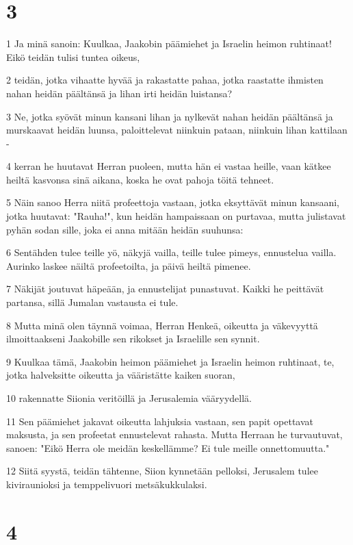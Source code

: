 \chapter{3}

\par 1 Ja minä sanoin: Kuulkaa, Jaakobin päämiehet ja Israelin heimon ruhtinaat! Eikö teidän tulisi tuntea oikeus,
\par 2 teidän, jotka vihaatte hyvää ja rakastatte pahaa, jotka raastatte ihmisten nahan heidän päältänsä ja lihan irti heidän luistansa?
\par 3 Ne, jotka syövät minun kansani lihan ja nylkevät nahan heidän päältänsä ja murskaavat heidän luunsa, paloittelevat niinkuin pataan, niinkuin lihan kattilaan -
\par 4 kerran he huutavat Herran puoleen, mutta hän ei vastaa heille, vaan kätkee heiltä kasvonsa sinä aikana, koska he ovat pahoja töitä tehneet.
\par 5 Näin sanoo Herra niitä profeettoja vastaan, jotka eksyttävät minun kansaani, jotka huutavat: "Rauha!", kun heidän hampaissaan on purtavaa, mutta julistavat pyhän sodan sille, joka ei anna mitään heidän suuhunsa:
\par 6 Sentähden tulee teille yö, näkyjä vailla, teille tulee pimeys, ennustelua vailla. Aurinko laskee näiltä profeetoilta, ja päivä heiltä pimenee.
\par 7 Näkijät joutuvat häpeään, ja ennustelijat punastuvat. Kaikki he peittävät partansa, sillä Jumalan vastausta ei tule.
\par 8 Mutta minä olen täynnä voimaa, Herran Henkeä, oikeutta ja väkevyyttä ilmoittaakseni Jaakobille sen rikokset ja Israelille sen synnit.
\par 9 Kuulkaa tämä, Jaakobin heimon päämiehet ja Israelin heimon ruhtinaat, te, jotka halveksitte oikeutta ja vääristätte kaiken suoran,
\par 10 rakennatte Siionia veritöillä ja Jerusalemia vääryydellä.
\par 11 Sen päämiehet jakavat oikeutta lahjuksia vastaan, sen papit opettavat maksusta, ja sen profeetat ennustelevat rahasta. Mutta Herraan he turvautuvat, sanoen: "Eikö Herra ole meidän keskellämme? Ei tule meille onnettomuutta."
\par 12 Siitä syystä, teidän tähtenne, Siion kynnetään pelloksi, Jerusalem tulee kiviraunioksi ja temppelivuori metsäkukkulaksi.

\chapter{4}

